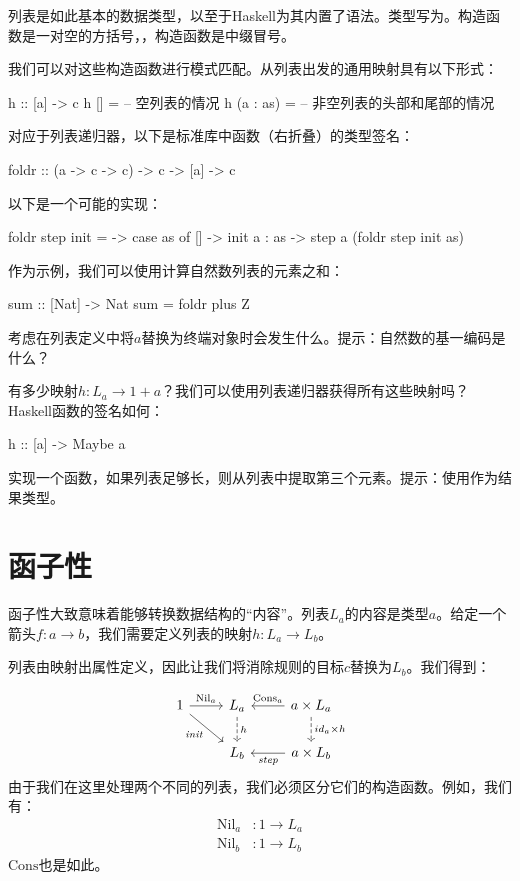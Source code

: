 \documentclass[DaoFP]{subfiles}
\begin{document}
列表是如此基本的数据类型，以至于Haskell为其内置了语法。类型写为\hask{[a]}。构造函数是一对空的方括号，\hask{[]}，构造函数是中缀冒号\hask{(:)}。

我们可以对这些构造函数进行模式匹配。从列表出发的通用映射具有以下形式：
\begin{haskell}
h :: [a] -> c
h []      = -- 空列表的情况
h (a : as) = -- 非空列表的头部和尾部的情况
\end{haskell}

对应于列表递归器，以下是标准库中函数（右折叠）的类型签名：
\begin{haskell}
foldr :: (a -> c -> c) -> c -> [a] -> c
\end{haskell}
以下是一个可能的实现：
\begin{haskell}
foldr step init = \as ->
  case as of
    [] -> init
    a : as -> step a (foldr step init as)
\end{haskell}

作为示例，我们可以使用计算自然数列表的元素之和：
\begin{haskell}
sum :: [Nat] -> Nat
sum = foldr plus Z
\end{haskell}


\begin{exercise}
考虑在列表定义中将$a$替换为终端对象时会发生什么。提示：自然数的基一编码是什么？
\end{exercise}
\begin{exercise}
有多少映射$h \colon L_a \to 1 + a$？我们可以使用列表递归器获得所有这些映射吗？Haskell函数的签名如何：
\begin{haskell}
h :: [a] -> Maybe a
\end{haskell}
\end{exercise}
\begin{exercise}
实现一个函数，如果列表足够长，则从列表中提取第三个元素。提示：使用作为结果类型。
\end{exercise}

\section{函子性}

函子性大致意味着能够转换数据结构的“内容”。列表$L_a$的内容是类型$a$。给定一个箭头$f \colon a \to b$，我们需要定义列表的映射$h \colon L_a \to L_b$。

列表由映射出属性定义，因此让我们将消除规则的目标$c$替换为$L_b$。我们得到：

\[
 \begin{tikzcd}
 1
 \arrow[r, "\text{Nil}_a"]
 \arrow[rd, "\mathit{init}"']
 &L_a
\arrow[d, dashed, "h"]
&a \times L_a
  \arrow[l, "\text{Cons}_a"']
\arrow[d, dashed, "id_a \times h"]
\\
& L_b
& a \times L_b
\arrow[l, "\mathit{step}"]
  \end{tikzcd}
\]
由于我们在这里处理两个不同的列表，我们必须区分它们的构造函数。例如，我们有：
\begin{align*}
\text{Nil}_a &\colon 1 \to L_a \\
\text{Nil}_b &\colon 1 \to L_b 
\end{align*}
$\text{Cons}$也是如此。
\end{document}
